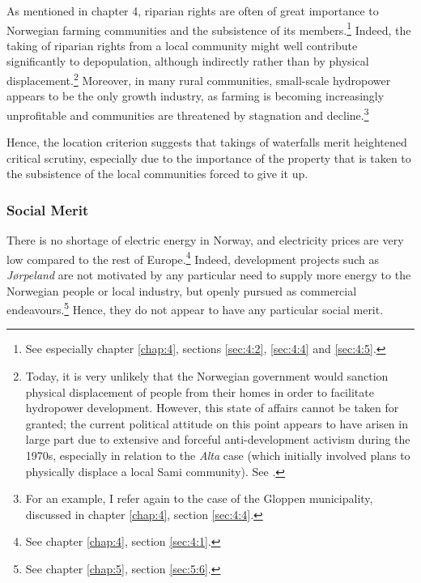  As mentioned in chapter 4, riparian rights are often of great importance to Norwegian farming communities and the subsistence of its members.\footnote{See especially chapter \ref{chap:4}, sections \ref{sec:4:2}, \ref{sec:4:4} and \ref{sec:4:5}.} Indeed, the taking of riparian rights from a local community might well contribute significantly to depopulation, although indirectly rather than by physical displacement.\footnote{Today, it is very unlikely that the Norwegian government would sanction physical displacement of people from their homes in order to facilitate hydropower development. However, this state of affairs cannot be taken for granted; the current political attitude on this point appears to have arisen in large part due to extensive and forceful anti-development activism during the 1970s, especially in relation to the {\it Alta} case (which initially involved plans to physically displace a local Sami community). See \cite{altawiki}.} Moreover, in many rural communities, small-scale hydropower appears to be the only growth industry, as farming is becoming increasingly unprofitable and communities are threatened by stagnation and decline.\footnote{For an example, I refer again to the case of the Gloppen municipality, discussed in chapter \ref{chap:4}, section \ref{sec:4:4}.}

Hence, the location criterion suggests that takings of waterfalls merit heightened critical scrutiny, especially due to the importance of the property that is taken to the subsistence of the local communities forced to give it up.

\subsubsection{Social Merit}\label{sec:5:7:5}

There is no shortage of electric energy in Norway, and electricity prices are very low compared to the rest of Europe.\footnote{See chapter \ref{chap:4}, section \ref{sec:4:1}.} Indeed, development projects such as {\it Jørpeland} are not motivated by any particular need to supply more energy to the Norwegian people or local industry, but openly pursued as commercial endeavours.\footnote{See chapter \ref{chap:5}, section \ref{sec:5:6}.} Hence, they do not appear to have any particular social merit.

